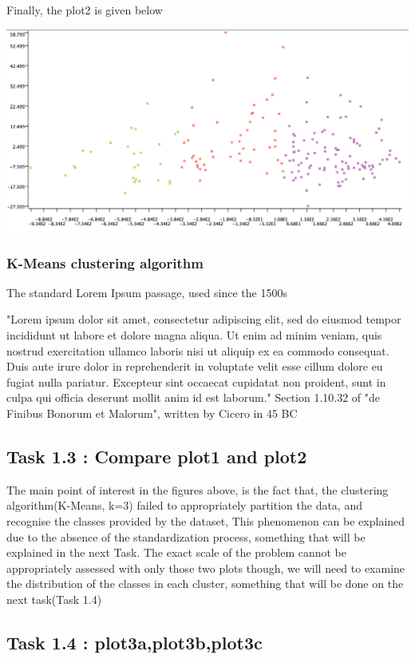 \documentclass[11pt]{article}
\begin{document}
			\fi
			Finally, the plot2 is given below
			\iftrue
			\begin{center}
				\includegraphics[scale=0.5]{res/t1/t12/t12-plot2}
			\end{center}
			\fi
			\subsubsection{K-Means clustering algorithm}
				The standard Lorem Ipsum passage, used since the 1500s
				
				"Lorem ipsum dolor sit amet, consectetur adipiscing elit, sed do eiusmod tempor incididunt ut labore et dolore magna aliqua. Ut enim ad minim veniam, quis nostrud exercitation ullamco laboris nisi ut aliquip ex ea commodo consequat. Duis aute irure dolor in reprehenderit in voluptate velit esse cillum dolore eu fugiat nulla pariatur. Excepteur sint occaecat cupidatat non proident, sunt in culpa qui officia deserunt mollit anim id est laborum."
				Section 1.10.32 of "de Finibus Bonorum et Malorum", written by Cicero in 45 BC
				
				 
		 \subsection*{Task 1.3 : Compare plot1 and plot2}
			The main point of interest in the figures above, is the fact that, the clustering algorithm(K-Means, k=3) failed to appropriately partition the data, and recognise the classes provided by the dataset, This phenomenon can be explained due to the absence of the standardization process, something that will be explained in the next Task. The exact scale of the problem cannot be appropriately assessed with only those two plots though, we will need to examine the distribution of the classes in each cluster, something that will be done on the next task(Task 1.4)
		
		 \subsection*{Task 1.4 : plot3a,plot3b,plot3c}
			
\end{document}
